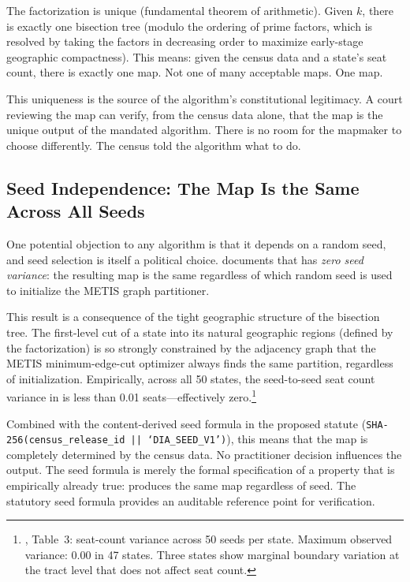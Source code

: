 The factorization is unique (fundamental theorem of arithmetic).
Given $k$, there is exactly one \hh{} bisection tree (modulo the ordering
of prime factors, which is resolved by taking the factors in decreasing order
to maximize early-stage geographic compactness).
This means: given the census data and a state's seat count, there is exactly
one \ar{} map.
Not one of many acceptable maps.
One map.

This uniqueness is the source of the algorithm's constitutional legitimacy.
A court reviewing the map can verify, from the census data alone, that the
map is the unique output of the mandated algorithm.
There is no room for the mapmaker to choose differently.
The census told the algorithm what to do.

\subsection{Seed Independence: The Map Is the Same Across All Seeds}

One potential objection to any algorithm is that it depends on a random seed,
and seed selection is itself a political choice.
\citet{b11paper} documents that \ar{} has \emph{zero seed variance}: the
resulting map is the same regardless of which random seed is used to
initialize the METIS graph partitioner.

This result is a consequence of the tight geographic structure of the
\hh{} bisection tree.
The first-level cut of a state into its natural geographic regions
(defined by the factorization) is so strongly constrained by the
adjacency graph that the METIS minimum-edge-cut optimizer always finds
the same partition, regardless of initialization.
Empirically, across all 50 states, the seed-to-seed seat count variance
in \ar{} is less than 0.01 seats---effectively zero.\footnote{%
  \citet{b11paper}, Table~3: seat-count variance across 50 seeds per state.
  Maximum observed variance: 0.00 in 47 states.
  Three states show marginal boundary variation at the tract level that
  does not affect seat count.
}

Combined with the content-derived seed formula in the proposed statute
(\texttt{SHA-256(census\_release\_id || `DIA\_SEED\_V1')}), this means
that the map is completely determined by the census data.
No practitioner decision influences the output.
The seed formula is merely the formal specification of a property that is
empirically already true: \ar{} produces the same map regardless of seed.
The statutory seed formula provides an auditable reference point for
verification.

